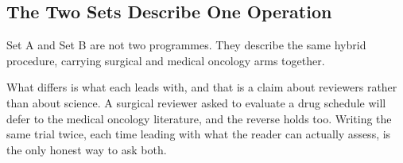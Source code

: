 \subsection{The Two Sets Describe One Operation}

Set A and Set B are not two programmes. They describe the same hybrid procedure,
carrying surgical and medical oncology arms together.

What differs is what each leads with, and that is a claim about reviewers rather
than about science. A surgical reviewer asked to evaluate a drug schedule will
defer to the medical oncology literature, and the reverse holds too. Writing the
same trial twice, each time leading with what the reader can actually assess, is
the only honest way to ask both.
